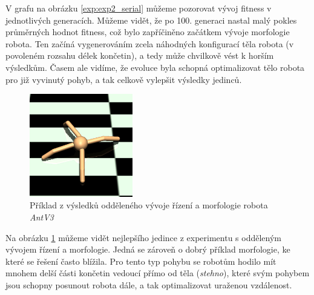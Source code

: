V grafu na obrázku \ref{exp:exp2_serial} můžeme pozorovat vývoj fitness v
jednotlivých generacích. Můžeme vidět, že po 100. generaci nastal malý pokles
průměrných hodnot fitness, což bylo zapříčiněno začátkem vývoje morfologie
robota. Ten začíná vygenerováním zcela náhodných konfigurací těla robota (v
povoleném rozsahu délek končetin), a tedy může chvilkově vést k horším
výsledkům. Časem ale vidíme, že evoluce byla schopná optimalizovat tělo robota
pro již vyvinutý pohyb, a tak celkově vylepšit výsledky jedinců.

\begin{figure}[h!]
    \centering
    \includegraphics[width=0.4\textwidth]{../img/crop_exp2_serial_top1.jpg}
    \caption{Příklad z výsledků odděleného vývoje řízení a morfologie robota
    \emph{AntV3}}
    \label{fig:exp2_serial_body_show}
\end{figure}

Na obrázku \ref{fig:exp2_serial_body_show} můžeme vidět nejlepšího jedince z
experimentu s odděleným vývojem řízení a morfologie. Jedná se zároveň o dobrý
příklad morfologie, ke které se řešení často blížila. Pro tento typ pohybu se 
robotům hodilo mít mnohem delší části končetin vedoucí přímo od těla
(\emph{stehno}), které svým pohybem jsou schopny posunout robota dále, a tak
optimalizovat uraženou vzdálenost.
